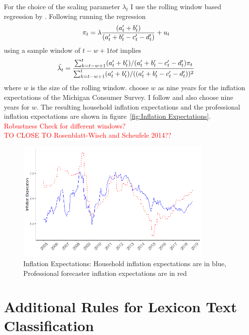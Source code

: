 \documentclass[review]{elsarticle}
\begin{document}
For the choice of the scaling parameter $\lambda_t$ I use the rolling window based regression by \cite{Lahiri2015}. Following \cite{Rosenblatt-Wisch2015} running the regression
\begin{align*}
\pi_t = \lambda \frac{(a_t\sp{\prime} + b_t\sp{\prime})}{(a_t\sp{\prime} + b_t\sp{\prime} - c_t\sp{\prime} - d_t\sp{\prime})} + u_t 
\end{align*}
using a sample window of $t - w + 1 to t$ implies
\begin{align*}
\hat{\lambda_t} = \frac{\sum^t_{k = t-w+1}(a_t\sp{\prime} + b_t\sp{\prime})/(a_t\sp{\prime} + b_t\sp{\prime} - c_t\sp{\prime} - d_t\sp{\prime})\pi_t}{\sum^t_{k = t-w+1}(a_t\sp{\prime} + b_t\sp{\prime})/((a_t\sp{\prime} + b_t\sp{\prime} - c_t\sp{\prime} - d_t\sp{\prime}))^2}
\end{align*}
where $w$ is the size of the rolling window. \cite{Lahiri2015} choose $w$ as nine years for the inflation expectations of the Michigan Consumer Survey. I follow \cite{Lahiri2015} and also choose nine years for $w$. The resulting household inflation expectations and the professional inflation expectations are shown in figure~\ref{fig:Inflation Expectations}.
\\
\textcolor{red}{Robustness Check for different windows?}
\\
\textcolor{red}{TO CLOSE TO Rosenblatt-Wisch and Scheufele 2014??}

  \begin{figure}[h!]
    \centering
    \includegraphics[width=\linewidth,height=6cm]{household_prof_inf.png}
    \caption{Inflation Expectations: Household inflation expectations are in blue, Professional forecaster inflation expectations are in red}
    \end{figure}
\label{fig:Inflation Expectations}

\section{Additional Rules for Lexicon Text Classification}\label{sec:Additional Rules for Lexicon Text Classification}
\end{document}

